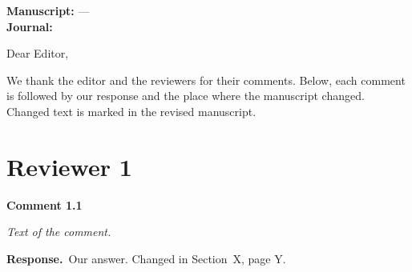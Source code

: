 \documentclass[11pt,a4paper]{article}
\newenvironment{reviewer}[1]{\par\medskip\noindent\textbf{#1}\par\nopagebreak
  \begin{shaded}\itshape}{\end{shaded}}
\newcommand{\response}{\par\noindent\textbf{Response.}~}
\begin{document}
\noindent\textbf{Manuscript:}  --- \\
\textbf{Journal:} 

\medskip\noindent Dear Editor,

\noindent We thank the editor and the reviewers for their comments. Below, each comment is followed by our
response and the place where the manuscript changed. Changed text is marked in the revised manuscript.

\section*{Reviewer 1}
\begin{reviewer}{Comment 1.1}
Text of the comment.
\end{reviewer}
\response Our answer. Changed in Section~X, page Y.
\end{document}
